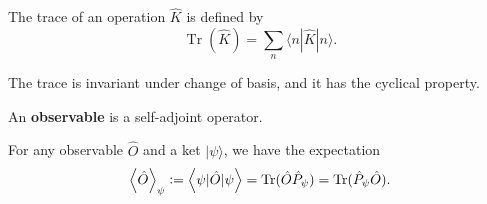 The trace of an operation $\hat{K}$  is defined by $$
\operatorname{Tr} (\hat{K}) = \sum_{n } \langle n | \hat{K} | n \rangle
.$$

The trace is invariant under change of basis, and it has the cyclical property. 

An \textbf{observable} is a self-adjoint operator.

For any observable $\hat{O}$ and a ket $| \psi \rangle$, we have the expectation $$
\left< \hat{O} \right>_\psi \vcentcolon= \left< \psi | \hat{O} | \psi \right> = \operatorname{Tr} (\hat{O} \hat{P}_\psi)  = \operatorname{Tr} (\hat{P}_\psi \hat{O})
.$$ 






